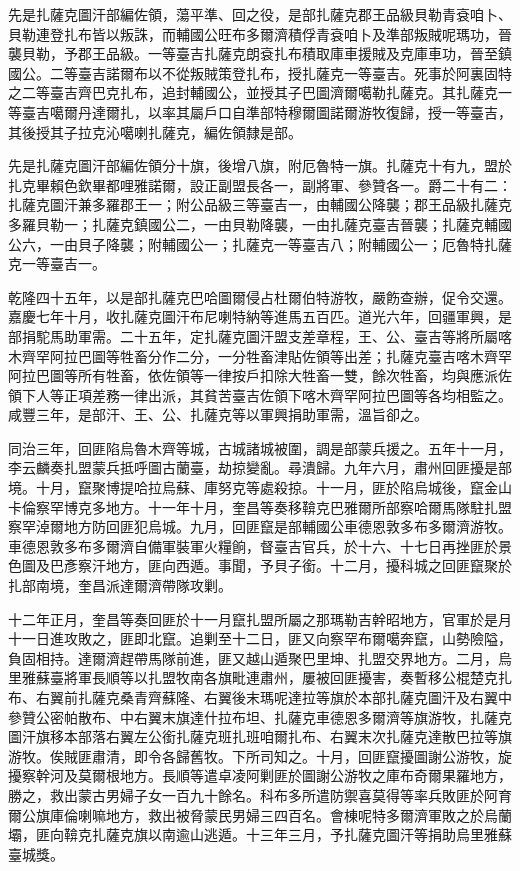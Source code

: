\begin{pinyinscope}
先是扎薩克圖汗部編佐領，蕩平準、回之役，是部扎薩克郡王品級貝勒青袞咱卜、貝勒連登扎布皆以叛誅，而輔國公旺布多爾濟積俘青袞咱卜及準部叛賊呢瑪功，晉襲貝勒，予郡王品級。一等臺吉扎薩克朗袞扎布積取庫車援賊及克庫車功，晉至鎮國公。二等臺吉諾爾布以不從叛賊策登扎布，授扎薩克一等臺吉。死事於阿裏固特之二等臺吉齊巴克扎布，追封輔國公，並授其子巴圖濟爾噶勒扎薩克。其扎薩克一等臺吉噶爾丹達爾扎，以率其屬戶口自準部特穆爾圖諾爾游牧復歸，授一等臺吉，其後授其子拉克沁噶喇扎薩克，編佐領隸是部。

先是扎薩克圖汗部編佐領分十旗，後增八旗，附厄魯特一旗。扎薩克十有九，盟於扎克畢賴色欽畢都哩雅諾爾，設正副盟長各一，副將軍、參贊各一。爵二十有二：扎薩克圖汗兼多羅郡王一；附公品級三等臺吉一，由輔國公降襲；郡王品級扎薩克多羅貝勒一；扎薩克鎮國公二，一由貝勒降襲，一由扎薩克臺吉晉襲；扎薩克輔國公六，一由貝子降襲；附輔國公一；扎薩克一等臺吉八；附輔國公一；厄魯特扎薩克一等臺吉一。

乾隆四十五年，以是部扎薩克巴哈圖爾侵占杜爾伯特游牧，嚴飭查辦，促令交還。嘉慶七年十月，收扎薩克圖汗布尼喇特納等進馬五百匹。道光六年，回疆軍興，是部捐駝馬助軍需。二十五年，定扎薩克圖汗盟支差章程，王、公、臺吉等將所屬喀木齊罕阿拉巴圖等牲畜分作二分，一分牲畜津貼佐領等出差；扎薩克臺吉喀木齊罕阿拉巴圖等所有牲畜，依佐領等一律按戶扣除大牲畜一雙，餘次牲畜，均與應派佐領下人等正項差務一律出派，其貧苦臺吉佐領下喀木齊罕阿拉巴圖等各均相監之。咸豐三年，是部汗、王、公、扎薩克等以軍興捐助軍需，溫旨卻之。

同治三年，回匪陷烏魯木齊等城，古城諸城被圍，調是部蒙兵援之。五年十一月，李云麟奏扎盟蒙兵抵呼圖古蘭臺，劫掠變亂。尋潰歸。九年六月，肅州回匪擾是部境。十月，竄聚博提哈拉烏蘇、庫努克等處殺掠。十一月，匪於陷烏城後，竄金山卡倫察罕博克多地方。十一年十月，奎昌等奏移鞥克巴雅爾所部察哈爾馬隊駐扎盟察罕淖爾地方防回匪犯烏城。九月，回匪竄是部輔國公車德恩敦多布多爾濟游牧。車德恩敦多布多爾濟自備軍裝軍火糧餉，督臺吉官兵，於十六、十七日再挫匪於景色圖及巴彥察汗地方，匪向西遁。事聞，予貝子銜。十二月，擾科城之回匪竄聚於扎部南境，奎昌派達爾濟帶隊攻剿。

十二年正月，奎昌等奏回匪於十一月竄扎盟所屬之那瑪勒吉幹昭地方，官軍於是月十一日進攻敗之，匪即北竄。追剿至十二日，匪又向察罕布爾噶奔竄，山勢險隘，負固相持。達爾濟趕帶馬隊前進，匪又越山遁聚巴里坤、扎盟交界地方。二月，烏里雅蘇臺將軍長順等以扎盟牧南各旗毗連肅州，屢被回匪擾害，奏暫移公棍楚克扎布、右翼前扎薩克桑青齊蘇隆、右翼後末瑪呢達拉等旗於本部扎薩克圖汗及右翼中參贊公密帕散布、中右翼末旗達什拉布坦、扎薩克車德恩多爾濟等旗游牧，扎薩克圖汗旗移本部落右翼左公銜扎薩克班扎班咱爾扎布、右翼末次扎薩克達散巴拉等旗游牧。俟賊匪肅清，即令各歸舊牧。下所司知之。十月，回匪竄擾圖謝公游牧，旋擾察幹河及莫爾根地方。長順等遣卓凌阿剿匪於圖謝公游牧之庫布奇爾果羅地方，勝之，救出蒙古男婦子女一百九十餘名。科布多所遣防禦喜莫得等率兵敗匪於阿育爾公旗庫倫喇嘛地方，救出被脅蒙民男婦三四百名。會棟呢特多爾濟軍敗之於烏蘭壩，匪向鞥克扎薩克旗以南逾山逃遁。十三年三月，予扎薩克圖汗等捐助烏里雅蘇臺城獎。


\end{pinyinscope}
